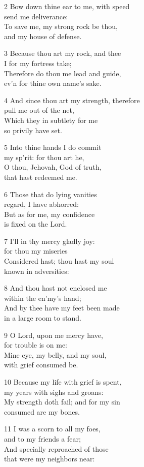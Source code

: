 2 Bow down thine ear to me, with speed\\
send me deliverance:\\
To save me, my strong rock be thou,\\
and my house of defense.

3 Because thou art my rock, and thee\\
I for my fortress take;\\
Therefore do thou me lead and guide,\\
ev’n for thine own name’s sake.

4 And since thou art my strength, therefore\\
pull me out of the net,\\
Which they in subtlety for me\\
so privily have set.

5 Into thine hands I do commit\\
my sp’rit: for thou art he,\\
O thou, Jehovah, God of truth,\\
that hast redeemed me.

6 Those that do lying vanities\\
regard, I have abhorred:\\
But as for me, my confidence\\
is fixed on the Lord.

7 I’ll in thy mercy gladly joy:\\
for thou my miseries\\
Considered hast; thou hast my soul\\
known in adversities:

8 And thou hast not enclosed me\\
within the en’my’s hand;\\
And by thee have my feet been made\\
in a large room to stand.

9 O Lord, upon me mercy have,\\
for trouble is on me:\\
Mine eye, my belly, and my soul,\\
with grief consumed be.

10 Because my life with grief is spent,\\
my years with sighs and groans:\\
My strength doth fail; and for my sin\\
consumed are my bones.

11 I was a scorn to all my foes,\\
and to my friends a fear;\\
And specially reproached of those\\
that were my neighbors near:

